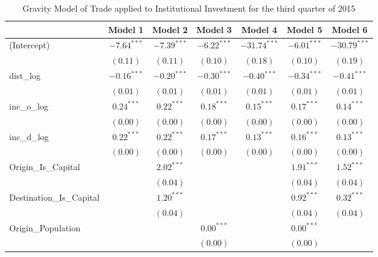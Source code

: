 \begin{table}
	\begin{center}
		\small
		\caption[Gravity Model of trade for Q3 2015]{Gravity Model of Trade applied to Institutional Investment for the third quarter of 2015}
		\begin{tabular}{l c c c c c c }
			\hline
			& Model 1 & Model 2 & Model 3 & Model 4 & Model 5 & Model 6 \\
			\hline
			(Intercept)                  & $-7.64^{***}$ & $-7.39^{***}$ & $-6.22^{***}$ & $-31.74^{***}$ & $-6.01^{***}$ & $-30.79^{***}$ \\
			& $(0.11)$      & $(0.11)$      & $(0.10)$      & $(0.18)$       & $(0.10)$      & $(0.19)$       \\
			dist\_log                    & $-0.16^{***}$ & $-0.20^{***}$ & $-0.30^{***}$ & $-0.40^{***}$  & $-0.34^{***}$ & $-0.41^{***}$  \\
			& $(0.01)$      & $(0.01)$      & $(0.01)$      & $(0.01)$       & $(0.01)$      & $(0.01)$       \\
			inc\_o\_log                  & $0.24^{***}$  & $0.22^{***}$  & $0.18^{***}$  & $0.15^{***}$   & $0.17^{***}$  & $0.14^{***}$   \\
			& $(0.00)$      & $(0.00)$      & $(0.00)$      & $(0.00)$       & $(0.00)$      & $(0.00)$       \\
			inc\_d\_log                  & $0.22^{***}$  & $0.22^{***}$  & $0.17^{***}$  & $0.13^{***}$   & $0.16^{***}$  & $0.13^{***}$   \\
			& $(0.00)$      & $(0.00)$      & $(0.00)$      & $(0.00)$       & $(0.00)$      & $(0.00)$       \\
			Origin\_Is\_Capital          &               & $2.02^{***}$  &               &                & $1.91^{***}$  & $1.52^{***}$   \\
			&               & $(0.04)$      &               &                & $(0.04)$      & $(0.04)$       \\
			Destination\_Is\_Capital     &               & $1.20^{***}$  &               &                & $0.92^{***}$  & $0.32^{***}$   \\
			&               & $(0.04)$      &               &                & $(0.04)$      & $(0.04)$       \\
			Origin\_Population           &               &               & $0.00^{***}$  &                & $0.00^{***}$  &                \\
			&               &               & $(0.00)$      &                & $(0.00)$      &                \\

\end{tabular}
\end{center}
\end{table}
